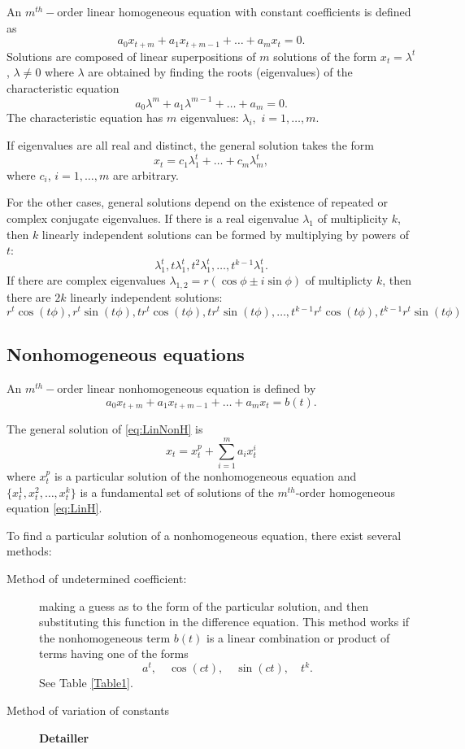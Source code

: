 An $m^{th}-$order linear homogeneous equation with constant coefficients is defined as
\begin{equation}\label{eq:LinH}
a_0x_{t+m}+a_1x_{t+m-1}+\dots + a_m x_{t}=0.
\end{equation}
Solutions are composed of linear superpositions of $m$ solutions of the form 
$x_t=\lambda ^t$, $\lambda \not = 0$
where $\lambda$ are obtained by finding the roots (eigenvalues) of the characteristic equation
$$a_0\lambda^{m}+a_1\lambda^{m-1}+\dots + a_m =0.$$
The characteristic equation has $m$ eigenvalues: $\lambda _i,$ $i=1,\dots, m$. 

If eigenvalues are all real and distinct, the general solution takes the form
$$x_t=c_1\lambda_1^t+\dots +c_m\lambda_m^t,$$
where $c_i$, $i=1,\dots ,m$ are arbitrary.

For the other cases, general solutions depend on the existence of repeated or complex conjugate eigenvalues. If there is a real eigenvalue $\lambda _1$ of multiplicity $k$, then $k$ linearly independent solutions can be formed by multiplying by powers of $t$:
$$\lambda_1 ^t, t \lambda_1 ^t, t^2\lambda_1 ^t, \dots , t^{k-1}\lambda_1 ^t.$$
If there are complex eigenvalues $\lambda _{1,2}=r(\cos \phi \pm i \sin \phi)$ of multiplicty $k$, then there are $2k$ linearly independent solutions:
$$r^t\cos(t\phi),r^t\sin (t\phi),tr^t\cos(t\phi),tr^t\sin (t\phi),\dots,t^{k-1}r^t\cos(t\phi),t^{k-1}r^t\sin (t\phi)$$




\subsection{Nonhomogeneous equations}
An $m^{th}-$order linear nonhomogeneous equation is defined by
\begin{equation}\label{eq:LinNonH}
a_0x_{t+m}+a_1x_{t+m-1}+\dots + a_m x_{t}=b(t).
\end{equation}

\begin{theorem}
The general solution of \eqref{eq:LinNonH} is
$$x_t=x_t^p+\sum_{i=1}^m a_i x_t^i$$
where $x_t^p$ is a particular solution of the nonhomogeneous equation and $\{x_t^1, x_t^2,\dots, x_t^k\}$ is a fundamental set of solutions of the $m^{th}$-order homogeneous equation \eqref{eq:LinH}.
\end{theorem}


To find a particular solution of a nonhomogeneous equation, there exist several methods:
\begin{description}
\item[Method of undetermined coefficient:] making a guess as to the form of the particular solution, and then substituting this function in the difference equation. This method works if the nonhomogeneous term $b(t)$ is a linear combination or product of terms having one of the forms
$$a^t, \quad \cos(ct), \quad  \sin(ct), \quad t^k.$$
See Table \ref{Table1}.
\item[Method of variation of constants] \textbf{Detailler}
\end{description}

